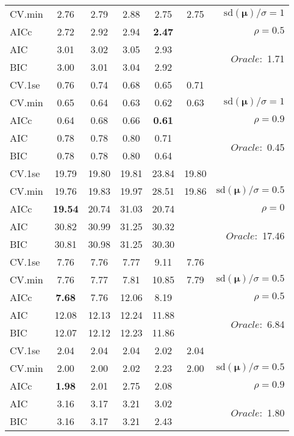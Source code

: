 \begin{table}
\begin{center}
\begin{tabular}{l*{5}{c}|r}
CV.min & 2.76 & 2.79 & 2.88 & 2.75 & 2.75 &  $\mathrm{sd}(\mathbf{\mu})/\sigma=1$ \\
AICc & 2.72 & 2.92 & 2.94 & {\bf 2.47} & & $\rho=0.5$ \\
AIC & 3.01 & 3.02 & 3.05 & 2.93 & &  \multirow{2}{*}{$Oracle: $ 1.71} \\
BIC & 3.00 & 3.01 & 3.04 & 2.92 & &  \\
 \hline 
CV.1se & 0.76 & 0.74 & 0.68 & 0.65 & 0.71 & \\
CV.min & 0.65 & 0.64 & 0.63 & 0.62 & 0.63 &  $\mathrm{sd}(\mathbf{\mu})/\sigma=1$ \\
AICc & 0.64 & 0.68 & 0.66 & {\bf 0.61} & & $\rho=0.9$ \\
AIC & 0.78 & 0.78 & 0.80 & 0.71 & &  \multirow{2}{*}{$Oracle: $ 0.45} \\
BIC & 0.78 & 0.78 & 0.80 & 0.64 & &  \\
 \hline 
CV.1se & 19.79 & 19.80 & 19.81 & 23.84 & 19.80 & \\
CV.min & 19.76 & 19.83 & 19.97 & 28.51 & 19.86 &  $\mathrm{sd}(\mathbf{\mu})/\sigma=0.5$ \\
AICc & {\bf 19.54} & 20.74 & 31.03 & 20.74 & & $\rho=0$ \\
AIC & 30.82 & 30.99 & 31.25 & 30.32 & &  \multirow{2}{*}{$Oracle: $ 17.46} \\
BIC & 30.81 & 30.98 & 31.25 & 30.30 & &  \\
 \hline 
CV.1se & 7.76 & 7.76 & 7.77 & 9.11 & 7.76 & \\
CV.min & 7.76 & 7.77 & 7.81 & 10.85 & 7.79 &  $\mathrm{sd}(\mathbf{\mu})/\sigma=0.5$ \\
AICc & {\bf 7.68} & 7.76 & 12.06 & 8.19 & & $\rho=0.5$ \\
AIC & 12.08 & 12.13 & 12.24 & 11.88 & &  \multirow{2}{*}{$Oracle: $ 6.84} \\
BIC & 12.07 & 12.12 & 12.23 & 11.86 & &  \\
 \hline 
CV.1se & 2.04 & 2.04 & 2.04 & 2.02 & 2.04 & \\
CV.min & 2.00 & 2.00 & 2.02 & 2.23 & 2.00 &  $\mathrm{sd}(\mathbf{\mu})/\sigma=0.5$ \\
AICc & {\bf 1.98} & 2.01 & 2.75 & 2.08 & & $\rho=0.9$ \\
AIC & 3.16 & 3.17 & 3.21 & 3.02 & &  \multirow{2}{*}{$Oracle: $ 1.80} \\
BIC & 3.16 & 3.17 & 3.21 & 2.43 & &  \\
 \hline 
\end{tabular}
\end{center}
\vspace{-1cm}
\end{table}




